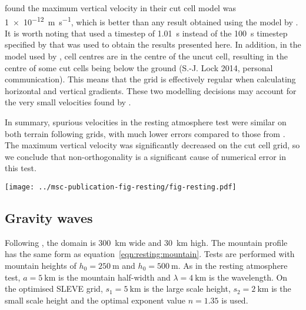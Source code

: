 \documentclass[twocol]{ametsoc}
\begin{document}
\citet{good2014} found the maximum vertical velocity in their cut cell model was \SI{1e-12}{\meter\per\second}, which is better than any result obtained using the model by \citet{weller-shahrokhi2014}.  It is worth noting that \citet{good2014} used a timestep of \SI{1.01}{\second} instead of the \SI{100}{\second} timestep specified by \citet{klemp2011} that was used to obtain the results presented here.  In addition, in the model used by \citet{good2014}, cell centres are in the centre of the uncut cell, resulting in the centre of some cut cells being below the ground (S.-J. Lock 2014, personal communication).  This means that the grid is effectively regular when calculating horizontal and vertical gradients.  These two modelling decisions may account for the very small velocities found by \citet{good2014}.

In summary, spurious velocities in the resting atmosphere test were similar on both terrain following grids, with much lower errors compared to those from \citet{klemp2011}.  The maximum vertical velocity was significantly decreased on the cut cell grid, so we conclude that non-orthogonality is a significant cause of numerical error in this test.

\begin{figure*}
	\centering
	\texttt{[image: ../msc-publication-fig-resting/fig-resting.pdf]}
%
	\caption{Maximum spurious vertical velocity, \(w\) (\si{\meter\per\second}), in the resting atmosphere test with results on (a) BTF, SLEVE, Hybrid Terrain Following (HTF) and Smoothed Terrain Following (STF) coordinates from \citet{klemp2011}, (b) BTF, SLEVE, cut cell and regular grids using the model from \citet{weller-shahrokhi2014}.  Note that vertical scales differ.}
	\label{fig:resting}
\end{figure*}

\subsection{Gravity waves}

Following \citet{melvin2010}, the domain is \SI{300}{\kilo\meter} wide and \SI{30}{\kilo\meter} high.  The mountain profile has the same form as equation~\ref{eqn:resting:mountain}.  Tests are performed with mountain heights of $h_0 = \SI{250}{\meter}$ and \(h_0 = \SI{500}{\meter}\).  As in the resting atmosphere test, $a = \SI{5}{\kilo\meter}$ is the mountain half-width and $\lambda = \SI{4}{\kilo\meter}$ is the wavelength.  On the optimised SLEVE grid, $s_1 = \SI{5}{\kilo\meter}$ is the large scale height, $s_2 = \SI{2}{\kilo\meter}$ is the small scale height and the optimal exponent value $n = 1.35$ is used.
\end{document}
